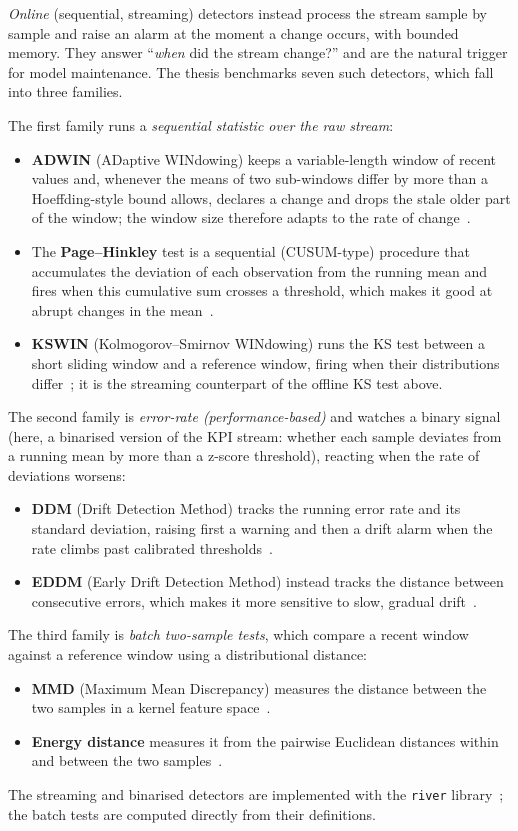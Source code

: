 \emph{Online} (sequential, streaming) detectors instead process the stream
sample by sample and raise an alarm at the moment a change occurs, with bounded
memory. They answer ``\emph{when} did the stream change?'' and are the natural
trigger for model maintenance. The thesis benchmarks seven such detectors, which
fall into three families.

The first family runs a \emph{sequential statistic over the raw stream}:
\begin{itemize}
  \item \textbf{ADWIN} (ADaptive WINdowing) keeps a variable-length window of
  recent values and, whenever the means of two sub-windows differ by more than a
  Hoeffding-style bound allows, declares a change and drops the stale older part
  of the window; the window size therefore adapts to the rate of
  change~\cite{bifet2007adwin}.
  \item The \textbf{Page--Hinkley} test is a sequential (CUSUM-type) procedure
  that accumulates the deviation of each observation from the running mean and
  fires when this cumulative sum crosses a threshold, which makes it good at
  abrupt changes in the mean~\cite{page1954cusum,gama2014survey}.
  \item \textbf{KSWIN} (Kolmogorov--Smirnov WINdowing) runs the KS test between a
  short sliding window and a reference window, firing when their distributions
  differ~\cite{raab2020kswin}; it is the streaming counterpart of the offline KS
  test above.
\end{itemize}

The second family is \emph{error-rate (performance-based)} and watches a binary
signal (here, a binarised version of the KPI stream: whether each sample
deviates from a running mean by more than a z-score threshold), reacting when
the rate of deviations worsens:
\begin{itemize}
  \item \textbf{DDM} (Drift Detection Method) tracks the running error rate and
  its standard deviation, raising first a warning and then a drift alarm when the
  rate climbs past calibrated thresholds~\cite{gama2004ddm,gama2014survey}.
  \item \textbf{EDDM} (Early Drift Detection Method) instead tracks the distance
  between consecutive errors, which makes it more sensitive to slow, gradual
  drift~\cite{baenagarcia2006eddm}.
\end{itemize}

The third family is \emph{batch two-sample tests}, which compare a recent window
against a reference window using a distributional distance:
\begin{itemize}
  \item \textbf{MMD} (Maximum Mean Discrepancy) measures the distance between the
  two samples in a kernel feature space~\cite{gretton2012mmd}.
  \item \textbf{Energy distance} measures it from the pairwise Euclidean
  distances within and between the two samples~\cite{szekely2013energy}.
\end{itemize}
The streaming and binarised detectors are implemented with the \texttt{river}
library~\cite{montiel2021river}; the batch tests are computed directly from their
definitions.

